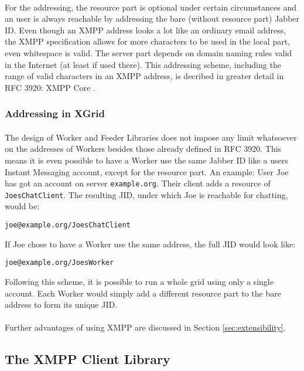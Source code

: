 \paragraph{}
For the addressing, the resource part is optional under certain circumstances and an user is always reachable by addressing the bare (without resource part) Jabber ID. Even though an XMPP address looks a lot like an ordinary email address, the XMPP specification allows for more characters to be used in the local part, even whitespace is valid. The server part depends on domain naming rules valid in the Internet (at least if used there). This addressing scheme, including the range of valid characters in an XMPP address, is decribed in greater detail in RFC 3920: XMPP Core \cite{xmpp-core}.

\subsubsection{Addressing in XGrid}
\label{sec:addressing}
\paragraph{}
The design of Worker and Feeder Libraries does not impose any limit whatsoever on the addresses of Workers besides those already defined in RFC 3920. This means it is even possible to have a Worker use the same Jabber ID like a users Instant Messaging account, except for the resource part. An example: User Joe has got an account on server \texttt{example.org}. Their client adds a resource of \texttt{JoesChatClient}. The resulting JID, under which Joe is reachable for chatting, would be:
\begin{center}
\texttt{joe@example.org/JoesChatClient}
\end{center}
If Joe chose to have a Worker use the same address, the full JID would look like:
\begin{center}
\texttt{joe@example.org/JoesWorker}
\end{center}
Following this scheme, it is possible to run a whole grid using only a single account. Each Worker would simply add a different resource part to the bare address to form its unique JID.
\paragraph{}
Further advantages of using XMPP are discussed in Section \ref{sec:extensibility}.

\subsection{The XMPP Client Library}
\label{sec:clientlib}
